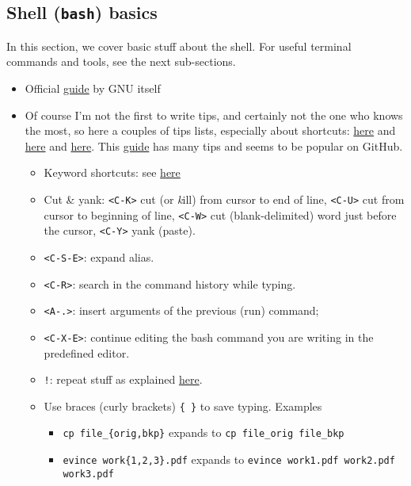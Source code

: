 \documentclass[a4paper,12pt,%
              final%
              ]{article}
\begin{document}
\subsection{Shell (\texttt{bash}) basics}
In this section, we cover basic stuff about the shell. For useful terminal commands and tools, see the next sub-sections.
\begin{itemize}
  \item Official \href{https://www.gnu.org/software/bash/manual/html_node/index.html}{guide} by GNU itself
  \item Of course I'm not the first to write tips, and certainly not the one who knows the most, so here a couples of tips lists, especially about shortcuts: \href{https://www.techrepublic.com/article/20-terminal-shortcuts-developers-need-to-know/}{here} and \href{https://www.howtogeek.com/howto/ubuntu/keyboard-shortcuts-for-bash-command-shell-for-ubuntu-debian-suse-redhat-linux-etc/}{here} and \href{https://devhints.io/bash}{here}. This \href{https://github.com/jlevy/the-art-of-command-line}{guide} has many tips and seems to be popular on GitHub.
    \begin{itemize}
      \item Keyword shortcuts: see \href{https://gist.github.com/tuxfight3r/60051ac67c5f0445efee}{here}
      \item Cut \& yank: \texttt{<C-K>} cut (or \emph{k}ill) from cursor to end of line, \texttt{<C-U>} cut from cursor to beginning of line, \texttt{<C-W>} cut (blank-delimited) word just before the cursor, \texttt{<C-Y>} yank (paste).
      \item \texttt{<C-S-E>}: expand alias.
      \item \texttt{<C-R>}: search in the command history while typing.
      \item \texttt{<A-.>}: insert arguments of the previous (run) command;
      \item \texttt{<C-X-E>}: continue editing the bash command you are writing in the predefined editor.
      \item \texttt{!}: repeat stuff as explained \href{https://www.redhat.com/sysadmin/bash-bang-commands}{here}.
      \item Use braces (curly brackets) \verb|{ }| to save typing. Examples
        \begin{itemize}
          \item \verb|cp file_{orig,bkp}| expands to \verb|cp file_orig file_bkp|
          \item \verb|evince work{1,2,3}.pdf| expands to \verb|evince work1.pdf work2.pdf work3.pdf|

\end{itemize}
\end{itemize}
\end{itemize}
\end{document}
